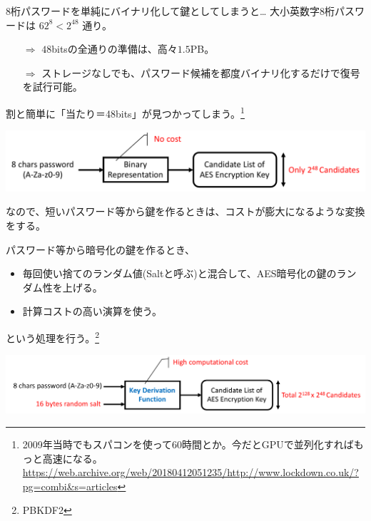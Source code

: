 \documentclass[12pt,dvipdfmx]{beamer}
\begin{document}
\begin{frame}
\begin{block}{\small 8桁パスワードを単純にバイナリ化して鍵としてしまうと…}
大小英数字$8$桁パスワードは $62^8 < 2^{48}$ 通り。

\begin{itemize}
\item[$\Rightarrow$] $48$bitsの全通りの準備は、高々$1.5$PB。
\item[$\Rightarrow$] ストレージなしでも、パスワード候補を都度バイナリ化するだけで復号を試行可能。
\end{itemize}
\alert{割と簡単に「当たり＝48bits」が見つかってしまう}。\footnote[frame]{\scriptsize 2009年当時でもスパコンを使って60時間とか。今だとGPUで並列化すればもっと高速になる。\url{https://web.archive.org/web/20180412051235/http://www.lockdown.co.uk/?pg=combi&s=articles}}
\end{block}
\vspace{1ex}

\begin{center}
\includegraphics[width=0.9\linewidth]{Figs/kdf_weak.pdf}
\end{center}

\end{frame}

\begin{frame}

なので、短いパスワード等から鍵を作るときは、コストが膨大になるような変換をする。

\vspace{2ex}
\begin{block}{}
パスワード等から暗号化の鍵を作るとき、
\begin{itemize}
\item 毎回使い捨てのランダム値(Saltと呼ぶ)と混合して、\alert{AES暗号化の鍵のランダム性を上げる}。
\item \alert{計算コストの高い演算}を使う。
\end{itemize}
という処理を行う。\footnote[frame]{PBKDF2}
\end{block}

\begin{center}
\includegraphics[width=\linewidth]{Figs/kdf_strong.pdf}
\end{center}

\end{frame}
\end{document}
